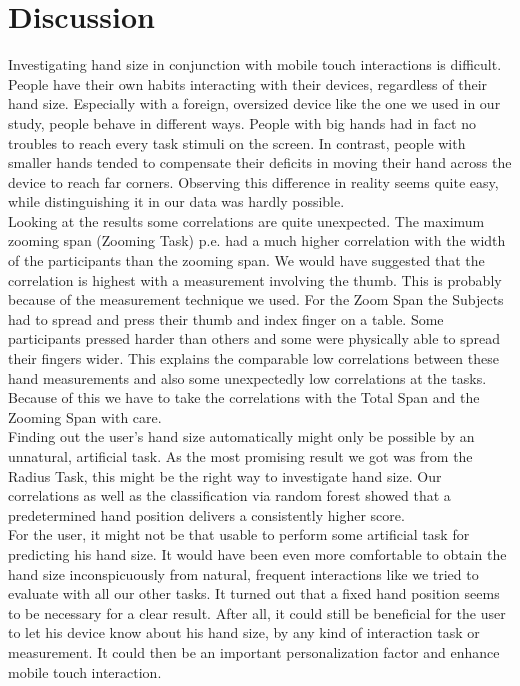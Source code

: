 \documentclass{sigchi}
\begin{document}
\section{Discussion}
Investigating hand size in conjunction with mobile touch interactions is difficult. People have their own habits interacting with their devices, regardless of their hand size. Especially with a foreign, oversized device like the one we used in our study, people behave in different ways. People with big hands had in fact no troubles to reach every task stimuli on the screen. In contrast, people with smaller hands tended to compensate their deficits in moving their hand across the device to reach far corners. Observing this difference in reality seems quite easy, while distinguishing it in our data was hardly possible.\\
Looking at the results some correlations are quite unexpected. The maximum zooming span (Zooming Task) p.e. had a much higher correlation with the width of the participants than the zooming span. We would have suggested that the correlation is highest with a measurement involving the thumb. This is probably because of the measurement technique we used. For the Zoom Span the Subjects had to spread and press their thumb and index finger on a table. Some participants pressed harder than others and some were physically able to spread their fingers wider. This explains the comparable low correlations between these hand measurements and also some unexpectedly low correlations at the tasks. Because of this we have to take the correlations with the Total Span and the Zooming Span with care.\\
Finding out the user's hand size automatically might only be possible by an unnatural, artificial task. As the most promising result we got was from the Radius Task, this might be the right way to investigate hand size. Our correlations as well as the classification via random forest showed that a predetermined hand position delivers a consistently higher score.\\
For the user, it might not be that usable to perform some artificial task for predicting his hand size. It would have been even more comfortable to obtain the hand size inconspicuously from natural, frequent interactions like we tried to evaluate with all our other tasks. It turned out that a fixed hand position seems to be necessary for a clear result. After all, it could still be beneficial for the user to let his device know about his hand size, by any kind of interaction task or measurement. It could then be an important personalization factor and enhance mobile touch interaction.
\end{document}
